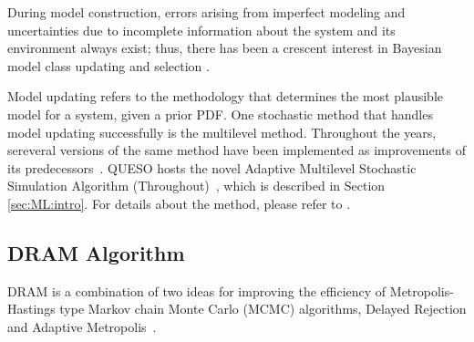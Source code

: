 During model construction, errors arising from imperfect modeling and uncertainties due to incomplete information about the system and its environment always exist; thus, there has been a crescent interest in Bayesian model class updating  and selection \cite{ChingChen2007,ChOlPr10,CheungPrudencio2012}. 

Model updating refers to the methodology that determines the most plausible model for a system, given a prior PDF. One stochastic method that handles model updating successfully is the multilevel method. Throughout the years, sereveral versions of the same method have been implemented as improvements of its predecessors~\cite{BeckAu2002,ChingChen2007,CheungPrudencio2012}. QUESO hosts the novel Adaptive Multilevel Stochastic Simulation Algorithm (Throughout)~\cite{CheungPrudencio2012}, which is described in Section \ref{sec:ML:intro}. For details about the method, please refer to \cite{CheungPrudencio2012}.



\subsection{DRAM Algorithm}\label{sec:DRAM}

DRAM is a combination of two ideas for improving the efficiency of Metropolis-Hastings type Markov chain Monte Carlo (MCMC) algorithms, Delayed Rejection and Adaptive Metropolis~\cite{DRAMtool}. 

